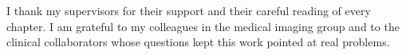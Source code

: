 I thank my supervisors for their support and their careful reading of every chapter. I am
grateful to my colleagues in the medical imaging group and to the clinical collaborators whose
questions kept this work pointed at real problems.
